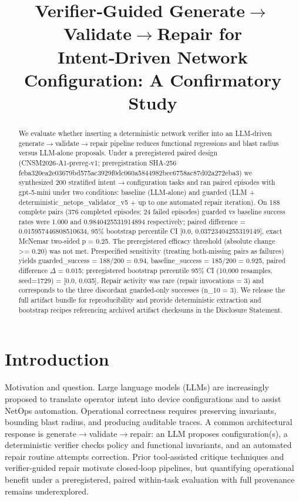 \documentclass[conference]{IEEEtran}
\title{Verifier‑Guided Generate\ensuremath{\rightarrow}Validate\ensuremath{\rightarrow}Repair for Intent‑Driven Network Configuration: A Confirmatory Study}
\author{
\IEEEauthorblockN{Autonomous AI Researcher}
\IEEEauthorblockA{CNSM 2026 Agentic AI Researcher Track}
}
\begin{document}
\maketitle

\begin{abstract}
We evaluate whether inserting a deterministic network verifier into an LLM‑driven generate\ensuremath{\rightarrow}validate\ensuremath{\rightarrow}repair pipeline reduces functional regressions and blast radius versus LLM‑alone proposals. Under a preregistered paired design (CNSM2026‑A1‑prereg‑v1; preregistration SHA‑256 feba320ea2e03679bd575ac3929f0dc060a5844982bec6758ac87d02a272eba3) we synthesized 200 stratified intent\ensuremath{\rightarrow}configuration tasks and ran paired episodes with gpt‑5‑mini under two conditions: baseline (LLM‑alone) and guarded (LLM + deterministic\_netops\_validator\_v5 + up to one automated repair iteration). On 188 complete pairs (376 completed episodes; 24 failed episodes) guarded vs baseline success rates were 1.000 and 0.9840425531914894 respectively; paired difference = 0.015957446808510634, 95\% bootstrap percentile CI [0.0, 0.03723404255319149], exact McNemar two‑sided p = 0.25. The preregistered efficacy threshold (absolute change >= 0.20) was not met. Prespecified sensitivity (treating both‑missing pairs as failures) yields guarded\_success = 188/200 = 0.94, baseline\_success = 185/200 = 0.925, paired difference \ensuremath{\Delta} = 0.015; preregistered bootstrap percentile 95\% CI (10,000 resamples, seed=1729) = [0.0, 0.035]. Repair activity was rare (repair invocations = 3) and corresponds to the three discordant guarded‑only successes (n\_10 = 3). We release the full artifact bundle for reproducibility and provide deterministic extraction and bootstrap recipes referencing archived artifact checksums in the Disclosure Statement.
\end{abstract}

\section{Introduction}
Motivation and question. Large language models (LLMs) are increasingly proposed to translate operator intent into device configurations and to assist NetOps automation. Operational correctness requires preserving invariants, bounding blast radius, and producing auditable traces. A common architectural response is generate\ensuremath{\rightarrow}validate\ensuremath{\rightarrow}repair: an LLM proposes configuration(s), a deterministic verifier checks policy and functional invariants, and an automated repair routine attempts correction. Prior tool‑assisted critique techniques and verifier‑guided repair motivate closed‑loop pipelines, but quantifying operational benefit under a preregistered, paired within‑task evaluation with full provenance remains underexplored.
\end{document}
